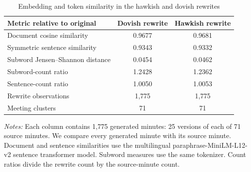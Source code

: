 \begin{table}[htbp]
\color{revisionred}
\centering
\begin{threeparttable}
\caption{Embedding and token similarity in the hawkish and dovish rewrites}
\label{tab:embedding-preservation}
\begin{scriptsize}
\begin{tabular}{lcc}
\toprule
Metric relative to original & Dovish rewrite & Hawkish rewrite \\
\midrule
Document cosine similarity & 0.9677 & 0.9681 \\
Symmetric sentence similarity & 0.9343 & 0.9332 \\
Subword Jensen--Shannon distance & 0.0454 & 0.0462 \\
Subword-count ratio & 1.2428 & 1.2362 \\
Sentence-count ratio & 1.0050 & 1.0053 \\
\midrule
Rewrite observations & 1,775 & 1,775 \\
Meeting clusters & 71 & 71 \\
\bottomrule
\end{tabular}
\begin{tablenotes}[flushleft]
\scriptsize
\item \textit{Notes:} Each column contains 1,775 generated minutes: 25 versions of each of 71 source minutes. We compare every generated minute with its source minute. Document and sentence similarities use the multilingual paraphrase-MiniLM-L12-v2 sentence transformer model. Subword measures use the same tokenizer. Count ratios divide the rewrite count by the source-minute count.
\end{tablenotes}
\end{scriptsize}
\end{threeparttable}
\end{table}
